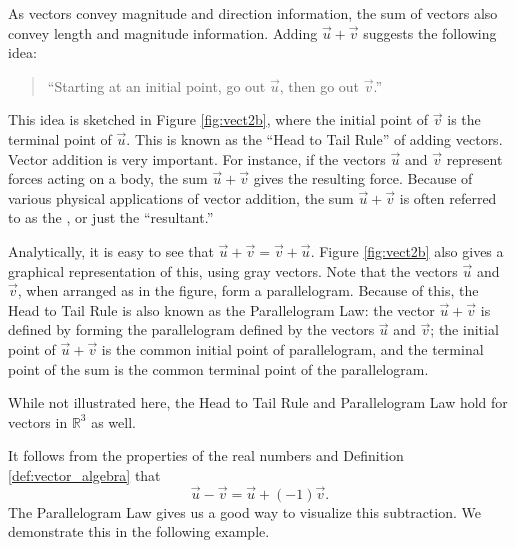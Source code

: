 As vectors convey magnitude and direction information, the sum of vectors also convey length and magnitude information. Adding $\vec u+\vec v$ suggests the following idea:
\begin{quotation}
``Starting at an initial point, go out $\vec u$, then go out $\vec v$.''
\end{quotation}

This idea is sketched in Figure \ref{fig:vect2b}, where the initial point of $\vec v$ is the terminal point of $\vec u$. This is known as the ``Head to Tail Rule'' of adding vectors. Vector addition is very important. For instance, if the vectors $\vec u$ and $\vec v$ represent forces acting on a body, the sum $\vec u+\vec v$ gives the resulting force. Because of various physical applications of vector addition, the sum $\vec u+\vec v$ is often referred to as the , or just the ``resultant.''

Analytically, it is easy to see that $\vec u+\vec v = \vec v+\vec u$. Figure \ref{fig:vect2b} also gives a graphical representation of this, using gray vectors. Note that the vectors $\vec u$ and $\vec v$, when arranged as in the figure, form a parallelogram. Because of this, the Head to Tail Rule is also known as the Parallelogram Law: the vector $\vec u+\vec v$ is defined by forming the parallelogram defined by the vectors $\vec u$ and $\vec v$; the initial point of $\vec u+\vec v$ is the common initial point of parallelogram, and the terminal point of the sum is the common terminal point of the parallelogram.


While not illustrated here, the Head to Tail Rule and Parallelogram Law hold for vectors in $\mathbb{R}^3$ as well.

It follows from the properties of the real numbers and Definition \ref{def:vector_algebra} that 
\[
\vec u-\vec v = \vec u + (-1)\vec v.
\]
The Parallelogram Law gives us a good way to visualize this subtraction. We demonstrate this in the following example.\\

